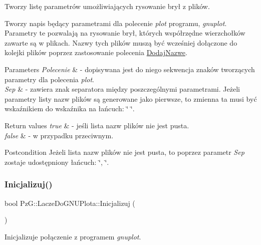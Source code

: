 Tworzy listę parametrów umożliwiających rysowanie brył z plików. 

Tworzy napis będący parametrami dla polecenie {\itshape plot} programu, {\itshape gnuplot}. Parametry te pozwalają na rysowanie brył, których współrzędne wierzchołków zawarte są w plikach. Nazwy tych plików muszą być wcześniej dołączone do kolejki plików poprzez zastosowanie polecenia \hyperlink{}{Dodaj\+Nazwe}.


\begin{DoxyParams}{Parameters}
{\em Polecenie} & -\/ dopisywana jest do niego sekwencja znaków tworzących parametry dla polecenia {\itshape plot}. \\
\hline
{\em Sep} & -\/ zawiera znak separatora między poszczególnymi parametrami. Jeżeli parametry listy nazw plików są generowane jako pierwsze, to zmienna ta musi być wskaźnikiem do wskaźnika na łańcuch\+: \char`\"{} \char`\"{}. \\
\hline
\end{DoxyParams}

\begin{DoxyRetVals}{Return values}
{\em true} & -\/ jeśli lista nazw plików nie jest pusta. \\
\hline
{\em false} & -\/ w przypadku przeciwnym. \\
\hline
\end{DoxyRetVals}
\begin{DoxyPostcond}{Postcondition}
Jeżeli lista nazw plików nie jest pusta, to poprzez parametr {\itshape Sep} zostaje udostępniony łańcuch\+: \char`\"{}, \char`\"{}. 
\end{DoxyPostcond}
\mbox{\label{classPzG_1_1LaczeDoGNUPlota_a200ce6bdb980c314a9eafe49e8f2dd5e}} 
\subsubsection{\texorpdfstring{Inicjalizuj()}{Inicjalizuj()}}
{\footnotesize\ttfamily bool Pz\+G\+::\+Lacze\+Do\+G\+N\+U\+Plota\+::\+Inicjalizuj (\begin{DoxyParamCaption}{ }\end{DoxyParamCaption})}



Inicjalizuje połączenie z programem {\itshape gnuplot}. 

